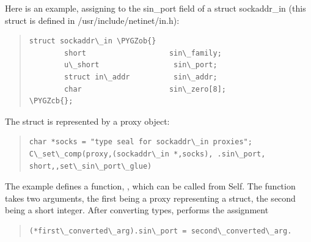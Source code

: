 \documentclass[letterpaper,10pt,english]{sphinxmanual}
\def\PYGZob{\char`\{}
\def\PYGZcb{\char`\}}
\begin{document}
Here is an example, assigning to the sin\_port field of a struct sockaddr\_in (this struct is defined
in /usr/include/netinet/in.h):
\begin{quote}

\begin{Verbatim}[commandchars=\\\{\}]
struct sockaddr\_in \PYGZob{}
        short                   sin\_family;
        u\_short                 sin\_port;
        struct in\_addr          sin\_addr;
        char                    sin\_zero[8];
\PYGZcb{};
\end{Verbatim}
\end{quote}

The struct is represented by a proxy object:
\begin{quote}

\begin{Verbatim}[commandchars=\\\{\}]
char *socks = "type seal for sockaddr\_in proxies";
C\_set\_comp(proxy,(sockaddr\_in *,socks), .sin\_port, short,,set\_sin\_port\_glue)
\end{Verbatim}
\end{quote}

The  example defines a function, , which can be called from
Self. The function takes two arguments, the first being a proxy representing a 
struct, the second being a short integer. After converting types,  performs
the assignment
\begin{quote}

\begin{Verbatim}[commandchars=\\\{\}]
(*first\_converted\_arg).sin\_port = second\_converted\_arg.
\end{Verbatim}
\end{quote}
\end{document}
